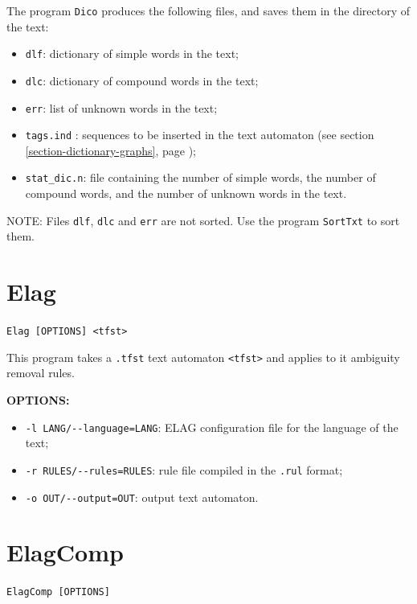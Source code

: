 \bigskip
\noindent The program \verb+Dico+ produces the following files, and saves
them in the directory of the text:

\begin{itemize}
  \item \verb+dlf+: dictionary of simple words in the text;
  \item \verb+dlc+: dictionary of compound words in the text;
  \item \verb+err+: list of unknown words in the text;
  \item \verb+tags.ind+ : sequences to be inserted in the text automaton
  (see section \ref{section-dictionary-graphs}, page \pageref{section-dictionary-graphs});
  \item \verb+stat_dic.n+: file containing the number of simple words, the number
  of compound words, and the number of unknown words in the text.
\end{itemize}

\bigskip
\noindent NOTE: Files \verb+dlf+, \verb+dlc+ and \verb+err+ are not sorted. Use the
program \verb+SortTxt+ to sort them.








\section{Elag}
\verb+Elag [OPTIONS] <tfst>+

\bigskip
\noindent This program takes a \verb+.tfst+ text automaton \verb+<tfst>+ and
applies to it ambiguity removal rules.

\bigskip
\noindent \textbf{OPTIONS:}
\begin{itemize}
  \item \verb+-l LANG/--language=LANG+: ELAG configuration file for the language of the
  text;
  \item \verb+-r RULES/--rules=RULES+: rule file compiled in the \verb+.rul+
  format; 
  \item \verb+-o OUT/--output=OUT+: output text automaton.
\end{itemize}







\section{ElagComp}
\verb+ElagComp [OPTIONS]+

